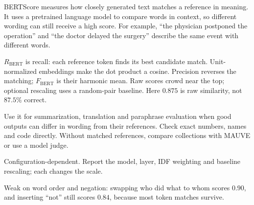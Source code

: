 \metricend
\clearpage
\thispagestyle{genaistyle}
\label{sec:bertscore}


BERTScore measures how closely generated text matches a reference in meaning. It uses a pretrained language model to compare words
in context, so different wording can still receive a high score. For example, ``the physician postponed the operation'' and ``the
doctor delayed the surgery'' describe the same event with different words.

\begin{metricformula}
\end{metricformula}

$R_{\text{BERT}}$ is recall: each reference token finds its best candidate match. Unit-normalized embeddings make the dot product a cosine. Precision reverses the matching; $F_{\text{BERT}}$ is their harmonic mean. Raw scores crowd near the top; optional rescaling uses a random-pair baseline. Here $0.875$ is raw similarity, not $87.5\%$ correct.


Use it for summarization, translation and paraphrase evaluation when good outputs can differ in wording from their references. Check exact numbers, names and code directly. Without matched references, compare collections with MAUVE or use a model judge.


{
\item Configuration-dependent. Report the model, layer, IDF weighting and baseline rescaling; each changes the scale.
\item Weak on word order and negation: swapping who did what to whom scores $0.90$, and inserting ``not'' still scores $0.84$,
because most token matches survive.
}

